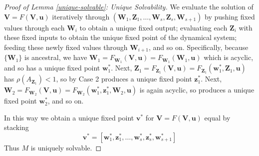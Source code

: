 \documentclass[12pt]{article}
\begin{document}
\begin{proof}[Proof of Lemma \ref{unique-solvable}: Unique Solvability]
We evaluate the solution of $\mathbf{V}=F(\mathbf{V},\mathbf{u})$ iteratively through $(\mathbf{W}_1,\mathbf{Z}_1,\hdots,\mathbf{W}_s,\mathbf{Z}_s,\mathbf{W}_{s+1})$ by pushing fixed values through each $\mathbf{W}_i$ to obtain a unique fixed output; evaluating each $\mathbf{Z}_i$ with these fixed inputs to obtain the unique fixed point of the dynamical system; feeding these newly fixed values through $\mathbf{W}_{i+1}$, and so on.
Specifically, because $\{\mathbf{W}_1\}$ is ancestral, we have $\mathbf{W}_1=F_{\mathbf{W}_1}(\mathbf{V},\mathbf{u})=F_{\mathbf{W}_1}(\mathbf{W}_1,\mathbf{u})$ which is acyclic, and so has a unique fixed point $\mathbf{w}_1^*$. Next, $\mathbf{Z}_1=F_{\mathbf{Z}_1}(\mathbf{V},\mathbf{u})=F_{\mathbf{Z}_1}(\mathbf{w}_1^*,\mathbf{Z}_1,\mathbf{u})$ has $\rho(A_{\mathbf{Z}_1})<1$, so by Case 2 produces a unique fixed point $\mathbf{z}_1^*$.
Next, $\mathbf{W}_2=F_{\mathbf{W}_2}(\mathbf{V},\mathbf{u})=F_{\mathbf{W}_2}(\mathbf{w}_1^*,\mathbf{z}_1^*,\mathbf{W}_2,\mathbf{u})$ is again acyclic, so produces a unique fixed point $\mathbf{w}_2^*$, and so on.

In this way we obtain a unique fixed point $\mathbf{v}^*$ for $\mathbf{V}=F(\mathbf{V},\mathbf{u})$ equal by stacking 
\[\mathbf{v}^*=[\mathbf{w}_1^*,\mathbf{z}_1^*,\hdots,\mathbf{w}_s^*,\mathbf{z}_s^*,\mathbf{w}_{s+1}^*]
\]
Thus $M$ is uniquely solvable.
\end{proof}


\end{document}
